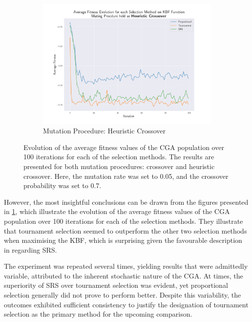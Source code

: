 \documentclass[10pt]{article}
\begin{document}
\begin{multicols}{2}
\begin{figure}[H]
\begin{subfigure}{0.44\textwidth}
        \includegraphics[width=\textwidth]{../figures/Permanent Images/Fitness_Evolution_Heuristic Crossover.png}
        \caption{Mutation Procedure: Heuristic Crossover}
    \end{subfigure}
    \captionsetup{justification=centering}
    \caption{Evolution of the average fitness values of the CGA population over 100 iterations for each of the selection methods. The results are presented for both mutation procedures: crossover and heuristic crossover. Here, the mutation rate was set to 0.05, and the crossover probability was set to 0.7.}
    \label{fig:CGA_fitness_evo}
\end{figure}

However, the most insightful conclusions can be drawn from the figures presented in \ref{fig:CGA_fitness_evo}, which illustrate the evolution of the average fitness values of the CGA population over 100 iterations for each of the selection methods. They illustrate that tournament selection seemed to outperform the other two selection methods when maximising the KBF, which is surprising given the favourable description in \cite{parks2023geneticalgorithms} regarding SRS. 

The experiment was repeated several times, yielding results that were admittedly variable, attributed to the inherent stochastic nature of the CGA. At times, the superiority of SRS over tournament selection was evident, yet proportional selection generally did not prove to perform better. Despite this variability, the outcomes exhibited sufficient consistency to justify the designation of tournament selection as the primary method for the upcoming comparison.


\end{multicols}
\end{document}
